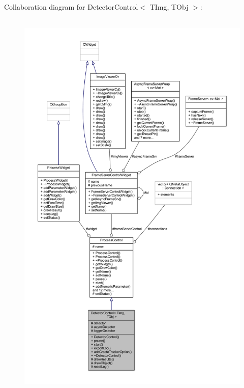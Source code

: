Collaboration diagram for Detector\+Control$<$ T\+Img, T\+Obj $>$\+:
\nopagebreak
\begin{figure}[H]
\begin{center}
\leavevmode
\includegraphics[height=550pt]{class_detector_control__coll__graph}
\end{center}
\end{figure}
